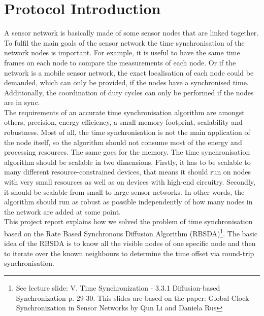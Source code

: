 \documentclass{llncs}
\begin{document}
	\section{Protocol Introduction}
	A sensor network is basically made of some sensor nodes that are linked together. To fulfil the main goals of the sensor network the time synchronisation of the network nodes is important.  For example, it is useful to have the same time frames on each node to compare the measurements of each node. Or if the network is a mobile sensor network, the exact localisation of each node could be demanded, which can only be provided, if the nodes have a synchronised time. Additionally, the coordination of duty cycles can only be performed if the nodes are in sync.\\
	The requirements of an accurate time synchronisation algorithm are amongst others, precision, energy efficiency, a small memory footprint, scalability and robustness. Most of all, the time synchronisation is not the main application of the node itself, so the algorithm should not consume most of the energy and processing resources. The same goes for the memory.
	\noindent The time synchronisation algorithm should be scalable in two dimensions. Firstly, it has to be scalable to many different resource-constrained devices, that means it should run on nodes with very small resources as well as on devices with high-end circuitry. Secondly, it should be scalable from small to large sensor networks. In other words, the algorithm should run as robust as possible independently of how many nodes in the network are added at some point.\\
	\noindent This project report explains how we solved the problem of time synchronisation based on the Rate Based Synchronous Diffusion Algorithm (RBSDA)\footnote{See lecture slide: V. Time Synchronization - 3.3.1 Diffusion-based Synchronization p. 29-30. This slides are based on the paper: Global Clock Synchronization
		in Sensor Networks by Qun Li and  Daniela Rus\cite{LiRus2006}}. The basic idea of the RBSDA is to know all the visible nodes of one specific node and then to iterate over the known neighbours to determine the time offset via round-trip synchronisation.\\
	
\end{document}
